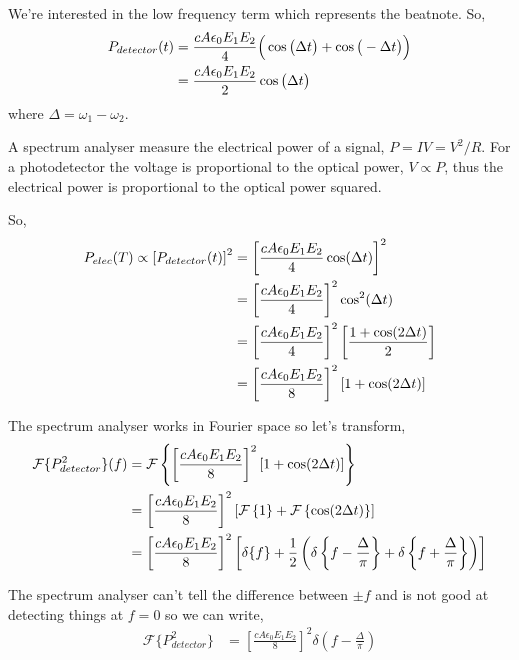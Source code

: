 We're interested in the low frequency term which represents the beatnote. So,
\begin{align}
P_{detector}(t) &= \frac{cA\epsilon_0E_1E_2}{4}\Big(\cos\big(\Delta t\big) + \cos\big(-\Delta t\big)\Big)\notag\\
&= \frac{cA\epsilon_0E_1E_2}{2}\cos\big(\Delta t\big)
\end{align}
where $\Delta=\omega_1-\omega_2$.

A spectrum analyser measure the electrical power of a signal, $P=IV=V^2/R$. For a photodetector the voltage is proportional to the optical power, $V\propto P$, thus the electrical power is proportional to the optical power squared.

So,
\begin{align}
P_{elec}(T) \propto \left[P_{detector}(t)\right]^2 &= \left[\frac{cA\epsilon_0E_1E_2}{4}\cos(\Delta t) \right]^2\notag\\
&= \left[\frac{cA\epsilon_0E_1E_2}{4}\right]^2 \cos^2(\Delta t)\notag\\
&= \left[\frac{cA\epsilon_0E_1E_2}{4}\right]^2 \left[\frac{1+\cos(2\Delta t)}{2}\right]\notag\\
&= \left[\frac{cA\epsilon_0E_1E_2}{8}\right]^2 \left[1+\cos(2\Delta t)\right]
\end{align}

The spectrum analyser works in Fourier space so let's transform,
\begin{align}
\mathcal{F}\{P_{detector}^2\}(f) &= \mathcal{F}\left\{\left[\frac{cA\epsilon_0E_1E_2}{8}\right]^2 \left[1+\cos(2\Delta t)\right]\right\}\notag\\
&= \left[\frac{cA\epsilon_0E_1E_2}{8}\right]^2 \left[\mathcal{F}\left\{1\right\}+\mathcal{F}\left\{\cos(2\Delta t)\right\}\right]\notag\\
&= \left[\frac{cA\epsilon_0E_1E_2}{8}\right]^2 \left[\delta\{f\}+\frac{1}{2}\left(\delta\left\{f-\frac{\Delta}{\pi}\right\}+\delta\left\{f+\frac{\Delta}{\pi}\right\}\right)\right]
\end{align}

The spectrum analyser can't tell the difference between $\pm f$ and is not good at detecting things at $f=0$ so we can write,
\begin{align}
\mathcal{F}\{P_{detector}^2\} &= \left[\frac{cA\epsilon_0E_1E_2}{8}\right]^2 \delta\left(f-\frac{\Delta}{\pi}\right)
\end{align}

